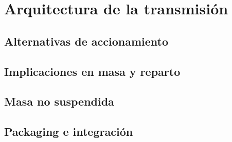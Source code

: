 \chapter{Arquitectura de la transmisión}
\label{ch:arquitectura_transmision}

\begin{objetivos}
  \item {}
  \item {}
  \item {}
\end{objetivos}


\section{Alternativas de accionamiento}
\label{sec:arquitectura_transmision:01}

\section{Implicaciones en masa y reparto}
\label{sec:arquitectura_transmision:02}

\section{Masa no suspendida}
\label{sec:arquitectura_transmision:03}

\section{Packaging e integración}
\label{sec:arquitectura_transmision:04}


\begin{caso}
\end{caso}

